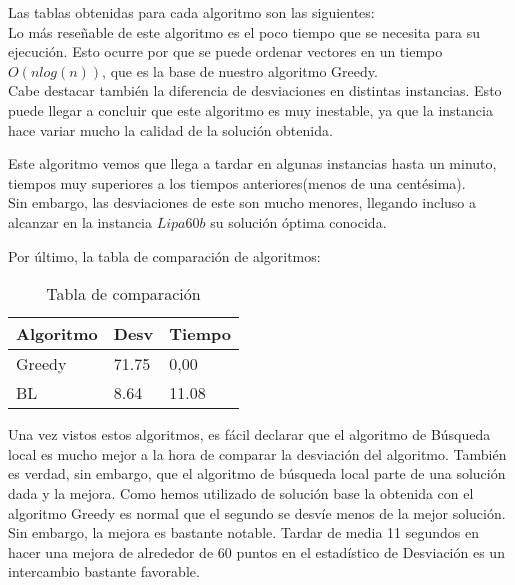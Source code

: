 Las tablas obtenidas para cada algoritmo son las siguientes:\\




Lo más reseñable de este algoritmo es el poco tiempo que se necesita para su ejecución. Esto ocurre por que se puede ordenar vectores en un tiempo $O(nlog(n))$, que es la base de nuestro algoritmo Greedy. \\

Cabe destacar también la diferencia de desviaciones en distintas instancias. Esto puede llegar a concluir que este algoritmo es muy inestable, ya que la instancia hace variar mucho la calidad de la solución obtenida.

\newpage



Este algoritmo vemos que llega a tardar en algunas instancias hasta un minuto, tiempos muy superiores a los tiempos anteriores(menos de una centésima).\\

Sin embargo, las desviaciones de este son mucho menores, llegando incluso a alcanzar en la instancia $Lipa60b$ su solución óptima conocida. 


\newpage
Por último, la tabla de comparación de algoritmos:

\begin{table}[htbp]
	\begin{center}
		\begin{tabular}{|l|l|l|}
			\hline
			Algoritmo &  Desv & Tiempo\\
			\hline \hline
			Greedy& 71.75 & 0,00\\ \hline
			BL& 8.64& 11.08\\ \hline
			
		\end{tabular}
		\caption{Tabla de comparación}
		\label{tabla:TablaComparacion}
	\end{center}
\end{table}

Una vez vistos estos algoritmos, es fácil declarar que el algoritmo de Búsqueda local es mucho mejor a la hora de comparar la desviación del algoritmo. También es verdad, sin embargo, que el algoritmo de búsqueda local parte de una solución dada y la mejora. Como hemos utilizado de solución base la obtenida con el algoritmo Greedy es normal que el segundo se desvíe menos de la mejor solución. Sin embargo, la mejora es bastante notable. Tardar de media 11 segundos en hacer una mejora de alrededor de 60 puntos en el estadístico de Desviación es un intercambio bastante favorable.








